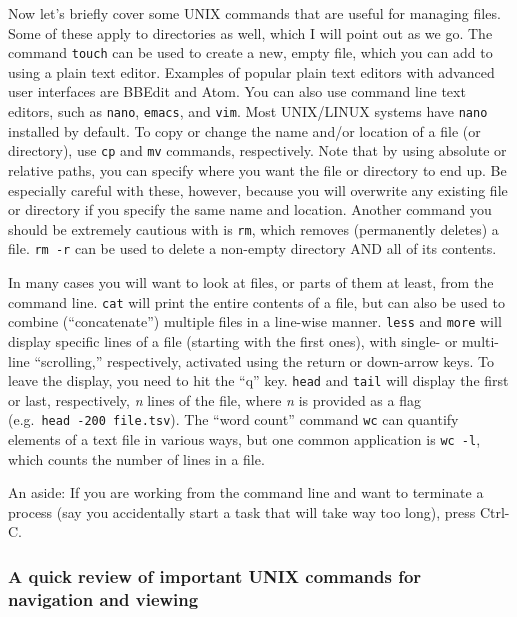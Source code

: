 \documentclass[
]{book}
\begin{document}
Now let's briefly cover some UNIX commands that are useful for managing files. Some of these apply to directories as well, which I will point out as we go. The command \texttt{touch} can be used to create a new, empty file, which you can add to using a plain text editor. Examples of popular plain text editors with advanced user interfaces are BBEdit and Atom. You can also use command line text editors, such as \texttt{nano}, \texttt{emacs}, and \texttt{vim}. Most UNIX/LINUX systems have \texttt{nano} installed by default. To copy or change the name and/or location of a file (or directory), use \texttt{cp} and \texttt{mv} commands, respectively. Note that by using absolute or relative paths, you can specify where you want the file or directory to end up. Be especially careful with these, however, because you will overwrite any existing file or directory if you specify the same name and location. Another command you should be extremely cautious with is \texttt{rm}, which removes (permanently deletes) a file. \texttt{rm\ -r} can be used to delete a non-empty directory AND all of its contents.

In many cases you will want to look at files, or parts of them at least, from the command line. \texttt{cat} will print the entire contents of a file, but can also be used to combine (``concatenate'') multiple files in a line-wise manner. \texttt{less} and \texttt{more} will display specific lines of a file (starting with the first ones), with single- or multi-line ``scrolling,'' respectively, activated using the return or down-arrow keys. To leave the display, you need to hit the ``q'' key. \texttt{head} and \texttt{tail} will display the first or last, respectively, \emph{n} lines of the file, where \emph{n} is provided as a flag (e.g.~\texttt{head\ -200\ file.tsv}). The ``word count'' command \texttt{wc} can quantify elements of a text file in various ways, but one common application is \texttt{wc\ -l}, which counts the number of lines in a file.

An aside: If you are working from the command line and want to terminate a process (say you accidentally start a task that will take way too long), press Ctrl-C.

\hypertarget{a-quick-review-of-important-unix-commands-for-navigation-and-viewing}{%
\subsubsection{A quick review of important UNIX commands for navigation and viewing}\label{a-quick-review-of-important-unix-commands-for-navigation-and-viewing}}
\end{document}
